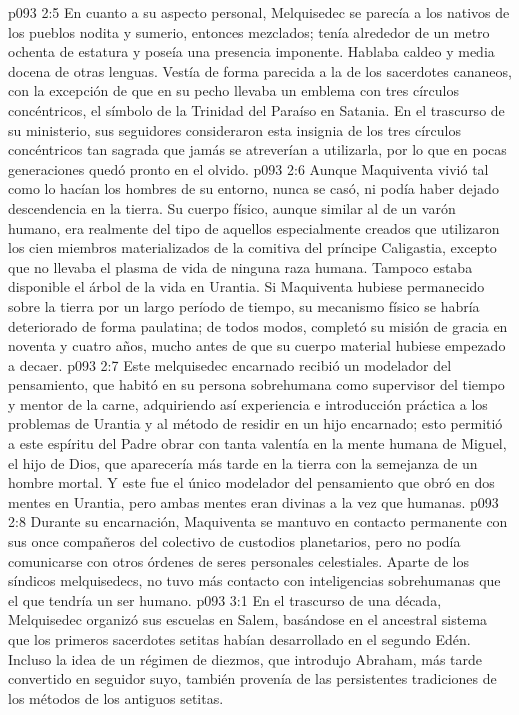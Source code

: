 \vs p093 2:5 \pc En cuanto a su aspecto personal, Melquisedec se parecía a los nativos de los pueblos nodita y sumerio, entonces mezclados; tenía alrededor de un metro ochenta de estatura y poseía una presencia imponente. Hablaba caldeo y media docena de otras lenguas. Vestía de forma parecida a la de los sacerdotes cananeos, con la excepción de que en su pecho llevaba un emblema con tres círculos concéntricos, el símbolo de la Trinidad del Paraíso en Satania. En el trascurso de su ministerio, sus seguidores consideraron esta insignia de los tres círculos concéntricos tan sagrada que jamás se atreverían a utilizarla, por lo que en pocas generaciones quedó pronto en el olvido.
\vs p093 2:6 Aunque Maquiventa vivió tal como lo hacían los hombres de su entorno, nunca se casó, ni podía haber dejado descendencia en la tierra. Su cuerpo físico, aunque similar al de un varón humano, era realmente del tipo de aquellos especialmente creados que utilizaron los cien miembros materializados de la comitiva del príncipe Caligastia, excepto que no llevaba el plasma de vida de ninguna raza humana. Tampoco estaba disponible el árbol de la vida en Urantia. Si Maquiventa hubiese permanecido sobre la tierra por un largo período de tiempo, su mecanismo físico se habría deteriorado de forma paulatina; de todos modos, completó su misión de gracia en noventa y cuatro años, mucho antes de que su cuerpo material hubiese empezado a decaer.
\vs p093 2:7 \pc Este melquisedec encarnado recibió un modelador del pensamiento, que habitó en su persona sobrehumana como supervisor del tiempo y mentor de la carne, adquiriendo así experiencia e introducción práctica a los problemas de Urantia y al método de residir en un hijo encarnado; esto permitió a este espíritu del Padre obrar con tanta valentía en la mente humana de Miguel, el hijo de Dios, que aparecería más tarde en la tierra con la semejanza de un hombre mortal. Y este fue el único modelador del pensamiento que obró en dos mentes en Urantia, pero ambas mentes eran divinas a la vez que humanas.
\vs p093 2:8 Durante su encarnación, Maquiventa se mantuvo en contacto permanente con sus once compañeros del colectivo de custodios planetarios, pero no podía comunicarse con otros órdenes de seres personales celestiales. Aparte de los síndicos melquisedecs, no tuvo más contacto con inteligencias sobrehumanas que el que tendría un ser humano.
\vs p093 3:1 En el trascurso de una década, Melquisedec organizó sus escuelas en Salem, basándose en el ancestral sistema que los primeros sacerdotes setitas habían desarrollado en el segundo Edén. Incluso la idea de un régimen de diezmos, que introdujo Abraham, más tarde convertido en seguidor suyo, también provenía de las persistentes tradiciones de los métodos de los antiguos setitas.
